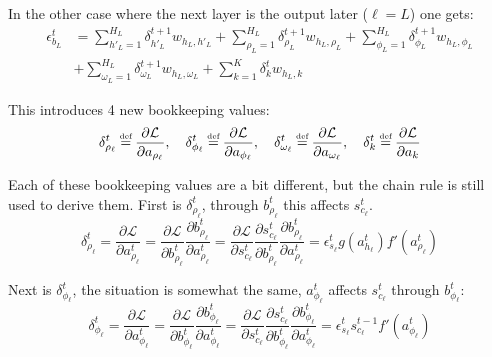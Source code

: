 In the other case where the next layer is the output later ($\ell = L$) one gets:
\begin{equation}
\begin{aligned}
\epsilon_{b_L}^t &=
	\sum_{h'_L=1}^{H_L} \delta_{h'_L}^{t+1} w_{h_L, h'_L}
	+ \sum_{\rho_L=1}^{H_L} \delta_{\rho_L}^{t+1} w_{h_L, \rho_L}
	+ \sum_{\phi_L=1}^{H_L} \delta_{\phi_L}^{t+1} w_{h_L, \phi_L} \\
&+
	\sum_{\omega_L=1}^{H_L} \delta_{\omega_L}^{t+1} w_{h_L, \omega_L}
	+ \sum_{k=1}^{K} \delta_{k}^t w_{h_L, k}
\end{aligned}
\end{equation}

This introduces 4 new bookkeeping values:
\begin{equation}
\delta_{\rho_\ell}^t \defeq \frac{\partial \mathcal{L}}{\partial a_{\rho_\ell}}
,\quad \delta_{\phi_\ell}^t \defeq \frac{\partial \mathcal{L}}{\partial a_{\phi_\ell}}
,\quad \delta_{\omega_\ell}^t \defeq \frac{\partial \mathcal{L}}{\partial a_{\omega_\ell}}
,\quad \delta_k^t \defeq \frac{\partial \mathcal{L}}{\partial a_k} 
\end{equation}

Each of these bookkeeping values are a bit different, but the chain rule is still used to derive them. First is $\delta_{\rho_\ell}^t$, through $b_{\rho_\ell}^t$ this affects $s_{c_\ell}^t$.
\begin{equation}
\delta_{\rho_\ell}^t
= \frac{\partial \mathcal{L}}{\partial a_{\rho_\ell}^t}
= \frac{\partial \mathcal{L}}{\partial b_{\rho_\ell}^t} \frac{\partial b_{\rho_\ell}^t}{\partial a_{\rho_\ell}^t}
= \frac{\partial \mathcal{L}}{\partial s_{c_\ell}^t} \frac{\partial s_{c_\ell}^t}{\partial b_{\rho_\ell}^t} \frac{\partial b_{\rho_\ell}^t}{\partial a_{\rho_\ell}^t}
= \epsilon_{s_\ell}^t g(a_{h_\ell}^t) f'(a_{\rho_\ell}^t)
\end{equation}

Next is $\delta_{\phi_\ell}^t$, the situation is somewhat the same, $a_{\phi_\ell}^t$ affects $s_{c_\ell}^t$ through $b_{\phi_\ell}^t$:
\begin{equation}
\delta_{\phi_\ell}^t
= \frac{\partial \mathcal{L}}{\partial a_{\phi_\ell}^t}
= \frac{\partial \mathcal{L}}{\partial b_{\phi_\ell}^t} \frac{\partial b_{\phi_\ell}^t}{\partial a_{\phi_\ell}^t}
= \frac{\partial \mathcal{L}}{\partial s_{c_\ell}^t} \frac{\partial s_{c_\ell}^t}{\partial b_{\phi_\ell}^t} \frac{\partial b_{\phi_\ell}^t}{\partial a_{\phi_\ell}^t}
= \epsilon_{s_\ell}^t s_{c_\ell}^{t-1} f'(a_{\phi_\ell}^t)
\end{equation}

